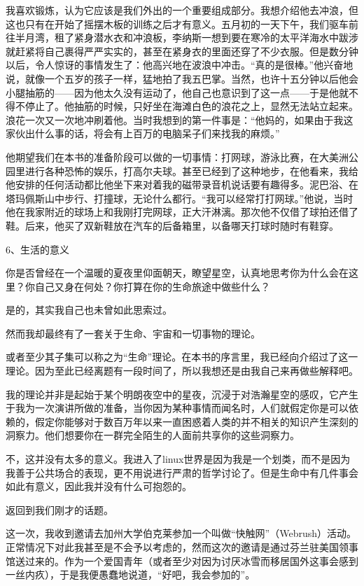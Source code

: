 我喜欢锻炼，认为它应该是我们外出的一个重要组成部分。我想介绍他去冲浪，但这也只有在开始了摇摆木板的训练之后才有意义。五月初的一天下午，我们驱车前往半月湾，租了紧身潜水衣和冲浪板，李纳斯一想到要在寒冷的太平洋海水中跋涉就赶紧将自己裹得严严实实的，甚至在紧身衣的里面还穿了不少衣服。但是数分钟以后，令人惊讶的事情发生了：他高兴地在波浪中冲击。“真的是很棒。”他兴奋地说，就像一个五岁的孩子一样，猛地拍了我五巴掌。当然，也许十五分钟以后他会小腿抽筋的——因为他太久没有运动了，他自己也意识到了这一点——于是他就不得不停止了。他抽筋的时候，只好坐在海滩白色的浪花之上，显然无法站立起来。浪花一次又一次地冲刷着他。当时我想到的第一件事是：“他妈的，如果由于我这家伙出什么事的话，将会有上百万的电脑呆子们来找我的麻烦。”

他期望我们在本书的准备阶段可以做的一切事情：打网球，游泳比赛，在大美洲公园里进行各种恐怖的娱乐，打高尔夫球。甚至已经到了这种地步，在他看来，我给他安排的任何活动都比他坐下来对着我的磁带录音机说话要有趣得多。泥巴浴、在塔玛佩斯山中步行、打撞球，无论什么都行。“我可以经常打打网球。”他说，当时他在我家附近的球场上和我刚打完网球，正大汗淋漓。那次他不仅借了球拍还借了鞋。后来，他买了双新鞋放在汽车的后备箱里，以备哪天打球时随时有鞋穿。

 
6、生活的意义

你是否曾经在一个温暖的夏夜里仰面朝天，瞭望星空，认真地思考你为什么会在这里？你自己又身在何处？你打算在你的生命旅途中做些什么？

是的，其实我自己也未曾如此思索过。

然而我却最终有了一套关于生命、宇宙和一切事物的理论。

或者至少其子集可以称之为“生命”理论。在本书的序言里，我已经向介绍过了这一理论。因为至此已经离题有一段时间了，所以我想还是由我自己来再做些解释吧。

我的理论并非是起始于某个明朗夜空中的星夜，沉浸于对浩瀚星空的感叹，它产生于我为一次演讲所做的准备，当你因为某种事情而闻名时，人们就假定你是可以依赖的，假定你能够对于数百万年以来一直困惑着人类的并不相关的知识产生深刻的洞察力。他们想要你在一群完全陌生的人面前共享你的这些洞察力。

不，这并没有太多的意义。我进入了linux世界是因为我是一个划类，而不是因为我善于公共场合的表现，更不用说进行严肃的哲学讨论了。但是生命中有几件事会如此有意义，因此我并没有什么可抱怨的。

返回到我们刚才的话题。

这一次，我收到邀请去加州大学伯克莱参加一个叫做“快触网”（Webrush）活动。正常情况下对此我甚至是不会予以考虑的，然而这次的邀请是通过芬兰驻美国领事馆送过来的。作为一个爱国青年（或者至少对因为讨厌冰雪而移居国外这事会感到一丝内疚），于是我便愚蠢地说道，“好吧，我会参加的”。

